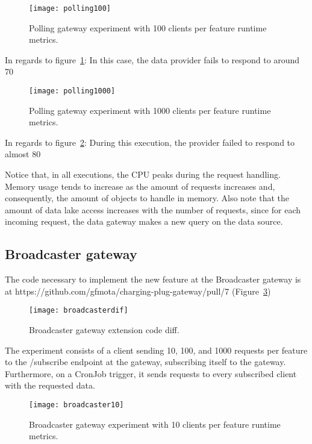 \begin{figure}
    \centering
    \texttt{[image: polling100]}
    \caption{Polling gateway experiment with 100 clients per feature runtime metrics.\label{fig:polling100}}
\end{figure}

In regards to figure~\ref{fig:polling100}: In this case, the data provider fails to respond to around 70%

\begin{figure}
    \centering
    \texttt{[image: polling1000]}
    \caption{Polling gateway experiment with 1000 clients per feature runtime metrics.\label{fig:polling1000}}
\end{figure}

In regards to figure~\ref{fig:polling1000}: During this execution, the provider failed to respond to almost 80%

Notice that, in all executions, the CPU peaks during the request handling. Memory usage tends to increase as the amount of requests increases and, consequently, the amount of objects to handle in memory. Also note that the amount of data lake access increases with the number of requests, since for each incoming request, the data gateway makes a new query on the data source.

\subsection*{Broadcaster gateway}
\label{sec:broadcasterresult}

The code necessary to implement the new feature at the Broadcaster gateway is at https://github.com/gfmota/charging-plug-gateway/pull/7 (Figure~\ref{fig:broadcasterdif})

\begin{figure}
    \centering
    \texttt{[image: broadcasterdif]}
    \caption{Broadcaster gateway extension code diff.\label{fig:broadcasterdif}}
\end{figure}

The experiment consists of a client sending 10, 100, and 1000 requests per feature to the /subscribe endpoint at the gateway, subscribing itself to the gateway. Furthermore, on a CronJob trigger, it sends requests to every subscribed client with the requested data.

\begin{figure}
    \centering
    \texttt{[image: broadcaster10]}
    \caption{Broadcaster gateway experiment with 10 clients per feature runtime metrics.\label{fig:broadcaster10}}
\end{figure}

